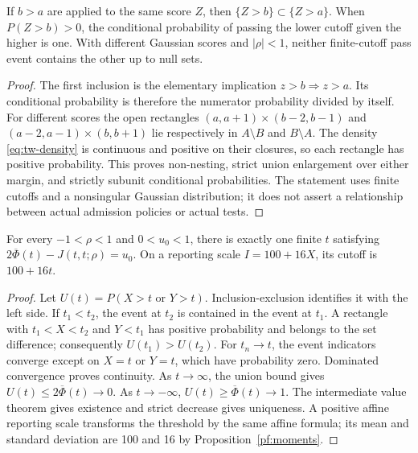 \begin{proposition}
\label{tw:nesting}
If \(b>a\) are applied to the same score \(Z\), then
\(\{Z>b\}\subset\{Z>a\}\). When \(P(Z>b)>0\), the conditional
probability of passing the lower cutoff given the higher is one.
With different Gaussian scores
and \(|\rho|<1\), neither finite-cutoff pass event contains the other
up to null sets.
\end{proposition}
\begin{proof}
The first inclusion is the elementary implication \(z>b\Rightarrow z>a\).
Its conditional probability is therefore the numerator probability divided
by itself. For different scores the open rectangles
\((a,a+1)\times(b-2,b-1)\) and
\((a-2,a-1)\times(b,b+1)\) lie respectively in \(A\setminus B\) and
\(B\setminus A\). The density \eqref{eq:tw-density} is continuous and
positive on their closures, so each rectangle has positive probability.
This proves non-nesting, strict union enlargement over either margin, and
strictly subunit conditional probabilities. The statement uses finite
cutoffs and a nonsingular Gaussian distribution; it does not assert a
relationship between actual admission policies or actual tests.
\end{proof}

\begin{proposition}
\label{tw:calibration}
For every \(-1<\rho<1\) and \(0<u_0<1\), there is exactly one finite
\(t\) satisfying
\(2\overline\Phi(t)-J(t,t;\rho)=u_0\).
On a reporting scale \(I=100+16X\), its cutoff is \(100+16t\).
\end{proposition}
\begin{proof}
Let \(U(t)=P(X>t\text{ or }Y>t)\). Inclusion-exclusion identifies it with
the left side. If \(t_1<t_2\), the event at \(t_2\) is contained in the
event at \(t_1\). A rectangle with \(t_1<X<t_2\) and \(Y<t_1\) has
positive probability and belongs to the set difference; consequently
\(U(t_1)>U(t_2)\). For \(t_n\to t\), the event indicators converge
except on \(X=t\) or \(Y=t\), which have probability zero. Dominated
convergence proves continuity. As \(t\to\infty\), the union bound gives
\(U(t)\leq2\overline\Phi(t)\to0\). As \(t\to-\infty\),
\(U(t)\geq\overline\Phi(t)\to1\). The intermediate value theorem gives
existence and strict decrease gives uniqueness. A positive affine reporting
scale transforms the threshold by the same affine formula; its mean and
standard deviation are 100 and 16 by Proposition~\ref{pf:moments}.
\end{proof}

